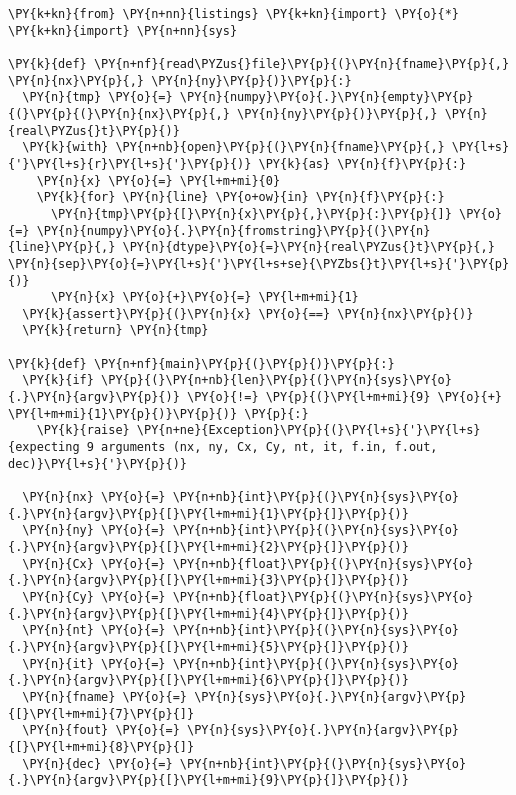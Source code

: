 \begin{Verbatim}[commandchars=\\\{\}]
\PY{k+kn}{from} \PY{n+nn}{listings} \PY{k+kn}{import} \PY{o}{*}
\PY{k+kn}{import} \PY{n+nn}{sys}

\PY{k}{def} \PY{n+nf}{read\PYZus{}file}\PY{p}{(}\PY{n}{fname}\PY{p}{,} \PY{n}{nx}\PY{p}{,} \PY{n}{ny}\PY{p}{)}\PY{p}{:}
  \PY{n}{tmp} \PY{o}{=} \PY{n}{numpy}\PY{o}{.}\PY{n}{empty}\PY{p}{(}\PY{p}{(}\PY{n}{nx}\PY{p}{,} \PY{n}{ny}\PY{p}{)}\PY{p}{,} \PY{n}{real\PYZus{}t}\PY{p}{)}
  \PY{k}{with} \PY{n+nb}{open}\PY{p}{(}\PY{n}{fname}\PY{p}{,} \PY{l+s}{'}\PY{l+s}{r}\PY{l+s}{'}\PY{p}{)} \PY{k}{as} \PY{n}{f}\PY{p}{:}
    \PY{n}{x} \PY{o}{=} \PY{l+m+mi}{0}
    \PY{k}{for} \PY{n}{line} \PY{o+ow}{in} \PY{n}{f}\PY{p}{:}
      \PY{n}{tmp}\PY{p}{[}\PY{n}{x}\PY{p}{,}\PY{p}{:}\PY{p}{]} \PY{o}{=} \PY{n}{numpy}\PY{o}{.}\PY{n}{fromstring}\PY{p}{(}\PY{n}{line}\PY{p}{,} \PY{n}{dtype}\PY{o}{=}\PY{n}{real\PYZus{}t}\PY{p}{,} \PY{n}{sep}\PY{o}{=}\PY{l+s}{'}\PY{l+s+se}{\PYZbs{}t}\PY{l+s}{'}\PY{p}{)}
      \PY{n}{x} \PY{o}{+}\PY{o}{=} \PY{l+m+mi}{1}
  \PY{k}{assert}\PY{p}{(}\PY{n}{x} \PY{o}{==} \PY{n}{nx}\PY{p}{)}
  \PY{k}{return} \PY{n}{tmp}

\PY{k}{def} \PY{n+nf}{main}\PY{p}{(}\PY{p}{)}\PY{p}{:}
  \PY{k}{if} \PY{p}{(}\PY{n+nb}{len}\PY{p}{(}\PY{n}{sys}\PY{o}{.}\PY{n}{argv}\PY{p}{)} \PY{o}{!=} \PY{p}{(}\PY{l+m+mi}{9} \PY{o}{+} \PY{l+m+mi}{1}\PY{p}{)}\PY{p}{)} \PY{p}{:} 
    \PY{k}{raise} \PY{n+ne}{Exception}\PY{p}{(}\PY{l+s}{'}\PY{l+s}{expecting 9 arguments (nx, ny, Cx, Cy, nt, it, f.in, f.out, dec)}\PY{l+s}{'}\PY{p}{)}

  \PY{n}{nx} \PY{o}{=} \PY{n+nb}{int}\PY{p}{(}\PY{n}{sys}\PY{o}{.}\PY{n}{argv}\PY{p}{[}\PY{l+m+mi}{1}\PY{p}{]}\PY{p}{)}
  \PY{n}{ny} \PY{o}{=} \PY{n+nb}{int}\PY{p}{(}\PY{n}{sys}\PY{o}{.}\PY{n}{argv}\PY{p}{[}\PY{l+m+mi}{2}\PY{p}{]}\PY{p}{)}
  \PY{n}{Cx} \PY{o}{=} \PY{n+nb}{float}\PY{p}{(}\PY{n}{sys}\PY{o}{.}\PY{n}{argv}\PY{p}{[}\PY{l+m+mi}{3}\PY{p}{]}\PY{p}{)}
  \PY{n}{Cy} \PY{o}{=} \PY{n+nb}{float}\PY{p}{(}\PY{n}{sys}\PY{o}{.}\PY{n}{argv}\PY{p}{[}\PY{l+m+mi}{4}\PY{p}{]}\PY{p}{)}
  \PY{n}{nt} \PY{o}{=} \PY{n+nb}{int}\PY{p}{(}\PY{n}{sys}\PY{o}{.}\PY{n}{argv}\PY{p}{[}\PY{l+m+mi}{5}\PY{p}{]}\PY{p}{)}
  \PY{n}{it} \PY{o}{=} \PY{n+nb}{int}\PY{p}{(}\PY{n}{sys}\PY{o}{.}\PY{n}{argv}\PY{p}{[}\PY{l+m+mi}{6}\PY{p}{]}\PY{p}{)}
  \PY{n}{fname} \PY{o}{=} \PY{n}{sys}\PY{o}{.}\PY{n}{argv}\PY{p}{[}\PY{l+m+mi}{7}\PY{p}{]}
  \PY{n}{fout} \PY{o}{=} \PY{n}{sys}\PY{o}{.}\PY{n}{argv}\PY{p}{[}\PY{l+m+mi}{8}\PY{p}{]}
  \PY{n}{dec} \PY{o}{=} \PY{n+nb}{int}\PY{p}{(}\PY{n}{sys}\PY{o}{.}\PY{n}{argv}\PY{p}{[}\PY{l+m+mi}{9}\PY{p}{]}\PY{p}{)}


\end{Verbatim}
